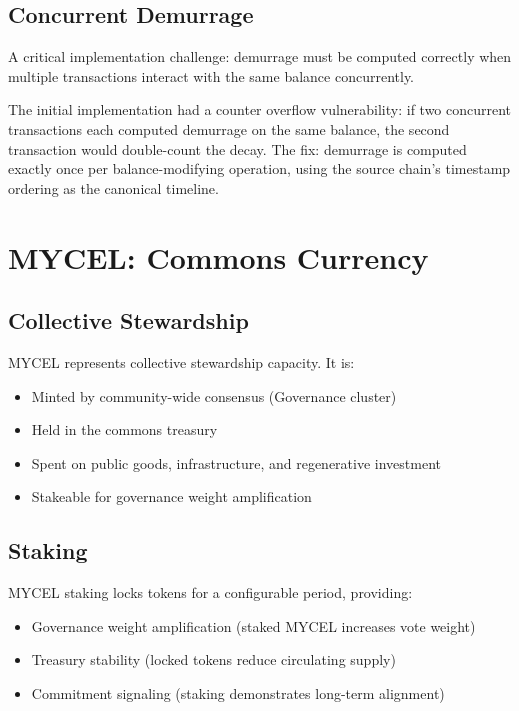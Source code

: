 \documentclass[11pt,twocolumn]{article}
\begin{document}
\subsection{Concurrent Demurrage}

A critical implementation challenge: demurrage must be computed correctly
when multiple transactions interact with the same balance concurrently.

The initial implementation had a counter overflow vulnerability: if two
concurrent transactions each computed demurrage on the same balance, the
second transaction would double-count the decay. The fix: demurrage is
computed exactly once per balance-modifying operation, using the source
chain's timestamp ordering as the canonical timeline.

\section{MYCEL: Commons Currency}

\subsection{Collective Stewardship}

MYCEL represents collective stewardship capacity. It is:
\begin{itemize}[nosep]
  \item Minted by community-wide consensus (Governance cluster)
  \item Held in the commons treasury
  \item Spent on public goods, infrastructure, and regenerative investment
  \item Stakeable for governance weight amplification
\end{itemize}

\subsection{Staking}

MYCEL staking locks tokens for a configurable period, providing:
\begin{itemize}[nosep]
  \item Governance weight amplification (staked MYCEL increases vote weight)
  \item Treasury stability (locked tokens reduce circulating supply)
  \item Commitment signaling (staking demonstrates long-term alignment)
\end{itemize}
\end{document}
